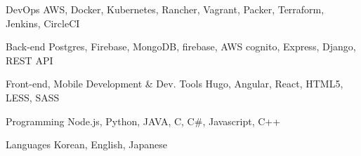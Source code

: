 

\begin{cvskills}

  \cvskill
    {DevOps} %
    {AWS, Docker, Kubernetes, Rancher, Vagrant, Packer, Terraform, Jenkins, CircleCI} %

  \cvskill
    {Back-end} %
    {Postgres, Firebase, MongoDB, firebase, AWS cognito, Express, Django, REST API} %

  \cvskill
    {Front-end, Mobile Development & Dev. Tools} %
    {Hugo, Angular, React, HTML5, LESS, SASS} %

  \cvskill
    {Programming} %
    {Node.js, Python, JAVA, C, C\#, Javascript, C++} %

  \cvskill
    {Languages} %
    {Korean, English, Japanese} %

\end{cvskills}
